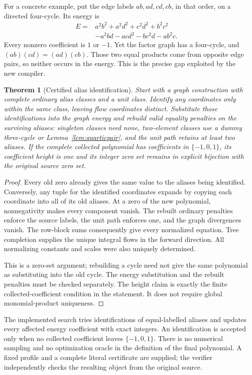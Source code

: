 \documentclass[11pt,letterpaper]{article}
\newtheorem{theorem}{Theorem}[section]
\theoremstyle{definition}\newtheorem{definition}[theorem]{Definition}
\theoremstyle{remark}\newtheorem{remark}[theorem]{Remark}
\begin{document}
For a concrete example, put the edge labels
\(ab,ad,cd,cb\), in that order, on a directed four-cycle. Its energy is
\begin{align*}
 E={}&a^2b^2+a^2d^2+c^2d^2+b^2c^2\\
     &-a^2bd-acd^2-bc^2d-ab^2c.
\end{align*}
Every nonzero coefficient is \(1\) or \(-1\). Yet the factor graph has
a four-cycle, and \((ab)(cd)=(ad)(cb)\). Those two equal products come
from opposite edge pairs, so neither occurs in the energy. This is the
precise gap exploited by the new compiler.

\begin{theorem}[Certified alias identification]\label{thm:quotient}
Start with a graph construction with complete ordinary alias classes
and a unit class. Identify any coordinates only within the same class,
leaving flow coordinates distinct. Substitute those identifications into
the graph energy and rebuild valid equality penalties on the surviving
aliases: singleton classes need none, two-element classes use a dummy
three-cycle or Lemma~\ref{lem:quarticpair}, and the unit path retains at
least two aliases. If the complete collected polynomial has coefficients in
\(\{-1,0,1\}\), its coefficient height is one and its integer zero
set remains in explicit bijection with the original source zero set.
\end{theorem}
\begin{proof}
Every old zero already gives the same value to the aliases being
identified. Conversely, any tuple for the identified coordinates expands
by copying each coordinate into all of its old aliases. At a zero of the
new polynomial, nonnegativity makes every component vanish. The rebuilt
ordinary penalties enforce the source labels, the unit path enforces
one, and the graph divergences vanish. The row-block sums consequently
give every normalized equation. Tree completion supplies the unique
integral flows in the forward direction. All normalizing constants and
scales were also uniquely determined.

This is a zero-set argument; rebuilding a cycle need not give the same
polynomial as substituting into the old cycle. The energy substitution
and the rebuilt penalties must be checked separately. The height claim
is exactly the finite collected-coefficient condition in the statement.
It does not require global monomial-product uniqueness.
\end{proof}

The implemented search tries identifications of equal-labelled aliases
and updates every affected energy coefficient with exact integers. An
identification is accepted only when no collected coefficient leaves
\(\{-1,0,1\}\). There is no numerical sampling and no optimization
oracle in the definition of the final polynomial. A fixed profile and a
complete literal certificate are supplied; the verifier independently
checks the resulting object from the original source.
\end{document}
